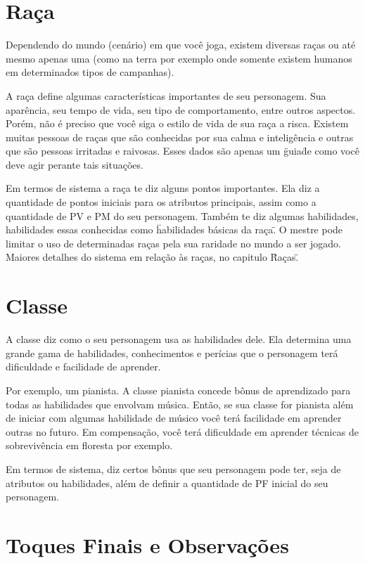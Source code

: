 \section{Raça}

Dependendo do mundo (cenário) em que você joga, existem diversas raças ou até mesmo apenas uma (como na terra por exemplo onde somente existem humanos em determinados tipos de campanhas).

A raça define algumas características importantes de seu personagem. Sua aparência, seu tempo de vida, seu tipo de comportamento, entre outros aspectos. Porém, não é preciso que você siga o estilo de vida de sua raça a risca. Existem muitas pessoas de raças que são conhecidas por sua calma e inteligência e outras que são pessoas irritadas e raivosas. Esses dados são apenas um \"guia\" de como você deve agir perante tais situações.

Em termos de sistema a raça te diz alguns pontos importantes. Ela diz a quantidade de pontos iniciais para os atributos principais, assim como a quantidade de PV e PM do seu personagem. Também te diz algumas habilidades, habilidades essas conhecidas como \"habilidades básicas da raça\". O mestre pode limitar o uso de determinadas raças pela sua raridade no mundo a ser jogado.
Maiores detalhes do sistema em relação às raças, no capitulo \"Raças\".

\section{Classe}

A classe diz como o seu personagem usa as habilidades dele. Ela determina uma grande gama de habilidades, conhecimentos e perícias que o personagem terá dificuldade e facilidade de aprender.

Por exemplo, um pianista. A classe pianista concede bônus de aprendizado para todas as habilidades que envolvam música. Então, se sua classe for pianista além de iniciar com algumas habilidade de músico você terá facilidade em aprender outras no futuro. Em compensação, você terá dificuldade em aprender técnicas de sobrevivência em floresta por exemplo. 

Em termos de sistema, diz certos bônus que seu personagem pode ter, seja de atributos ou habilidades, além de definir a quantidade de PF inicial do seu personagem. 

\section{Toques Finais e Observações}

